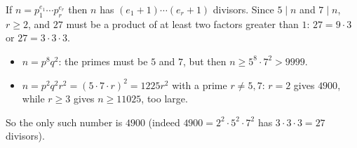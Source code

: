 If $n=p_1^{e_1}\cdots p_r^{e_r}$ then $n$ has $(e_1+1)\cdots(e_r+1)$ divisors. Since $5\mid n$ and $7\mid n$, $r\ge2$, and $27$ must be a product of at least two factors greater than $1$: $27=9\cdot3$ or $27=3\cdot3\cdot3$.
\begin{itemize}
\item $n=p^8q^2$: the primes must be $5$ and $7$, but then $n\ge5^8\cdot7^2>9999$.
\item $n=p^2q^2r^2=(5\cdot7\cdot r)^2=1225r^2$ with a prime $r\ne5,7$: $r=2$ gives $4900$, while $r\ge3$ gives $n\ge11025$, too large.
\end{itemize}
So the only such number is $\boxed{4900}$ (indeed $4900=2^2\cdot5^2\cdot7^2$ has $3\cdot3\cdot3=27$ divisors).

